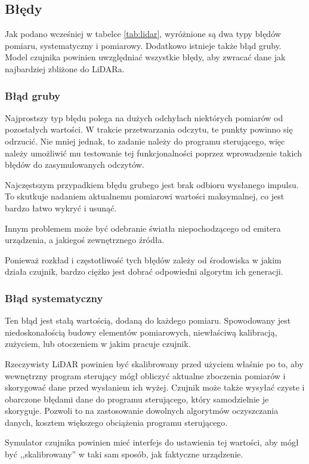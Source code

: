 	\subsection{Błędy}
		Jak podano wcześniej w tabelce \ref{tab:lidar}, wyróżnione są dwa typy błędów pomiaru, systematyczny i pomiarowy.
		Dodatkowo istnieje także błąd gruby.
		Model czujnika powinien uwzględniać wszystkie błędy, aby zwracać dane jak najbardziej zbliżone do LiDARa.

		\subsubsection{Błąd gruby}
			Najprostszy typ błędu polega na dużych odchyłach niektórych pomiarów od pozostałych wartości.
			W trakcie przetwarzania odczytu, te punkty powinno się odrzucić.
			Nie mniej jednak, to zadanie należy do programu sterującego, więc należy umożliwić mu testowanie tej funkcjonalności poprzez wprowadzenie takich błędów do zasymulowanych odczytów.

			Najczęstszym przypadkiem błędu grubego jest brak odbioru wysłanego impulsu. 
			To skutkuje nadaniem aktualnemu pomiarowi wartości maksymalnej, co jest bardzo łatwo wykryć i usunąć.

			Innym problemem może być odebranie światła niepochodzącego od emitera urządzenia, a jakiegoś zewnętrznego źródła.

			Ponieważ rozkład i częstotliwość tych błędów zależy od środowiska w jakim działa czujnik, bardzo ciężko jest dobrać odpowiedni algorytm ich generacji.

		\subsubsection{Błąd systematyczny}
			Ten błąd jest stałą wartością, dodaną do każdego pomiaru.
			Spowodowany jest niedoskonałością budowy elementów pomiarowych, niewłaściwą kalibracją, zużyciem, lub otoczeniem w jakim pracuje czujnik.

			Rzeczywisty LiDAR powinien być skalibrowany przed użyciem właśnie po to, aby wewnętrzny program sterujący mógł obliczyć aktualne zboczenia pomiarów
			i skorygować dane przed wysłaniem ich wyżej.
			Czujnik może także wysyłać czyste i obarczone błędami dane do programu sterującego, który samodzielnie je skoryguje.
			Pozwoli to na zastosowanie dowolnych algorytmów oczyszczania danych, kosztem większego obciążenia programu sterującego.

			Symulator czujnika powinien mieć interfejs do ustawienia tej wartości, aby mógł być ,,skalibrowany'' w taki sam sposób, jak faktyczne urządzenie.

